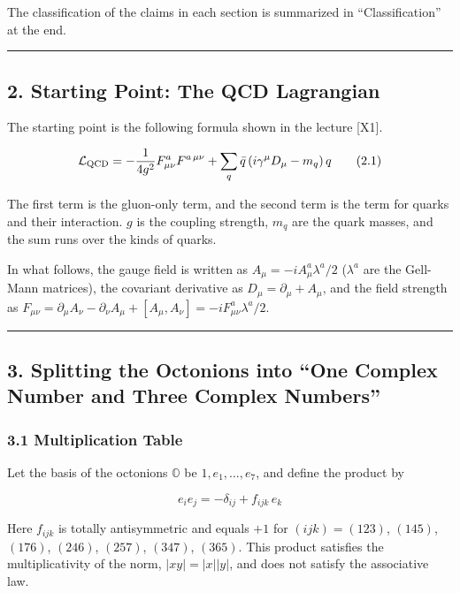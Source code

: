 \documentclass[
  a4paper,
]{article}
\begin{document}
The classification of the claims in each section is summarized in
``Classification'' at the end.

\begin{center}\rule{0.5\linewidth}{0.5pt}\end{center}

\subsection{2. Starting Point: The QCD
Lagrangian}\label{starting-point-the-qcd-lagrangian}

The starting point is the following formula shown in the lecture
{[}X1{]}.

\[
\mathcal{L}_{\rm QCD} = -\frac{1}{4g^2}F^a_{\mu\nu}F^{a\,\mu\nu} + \sum_q \bar q\,(i\gamma^\mu D_\mu - m_q)\,q \tag{2.1}
\]

The first term is the gluon-only term, and the second term is the term
for quarks and their interaction. \(g\) is the coupling strength,
\(m_q\) are the quark masses, and the sum runs over the kinds of quarks.

In what follows, the gauge field is written as
\(A_\mu = -iA^a_\mu\lambda^a/2\) (\(\lambda^a\) are the Gell-Mann
matrices), the covariant derivative as \(D_\mu = \partial_\mu + A_\mu\),
and the field strength as
\(F_{\mu\nu} = \partial_\mu A_\nu - \partial_\nu A_\mu + [A_\mu, A_\nu] = -iF^a_{\mu\nu}\lambda^a/2\).

\begin{center}\rule{0.5\linewidth}{0.5pt}\end{center}

\subsection{3. Splitting the Octonions into ``One Complex Number and
Three Complex
Numbers''}\label{splitting-the-octonions-into-one-complex-number-and-three-complex-numbers}

\subsubsection{3.1 Multiplication Table}\label{multiplication-table}

Let the basis of the octonions \(\mathbb{O}\) be \(1, e_1, \dots, e_7\),
and define the product by

\[
e_i e_j = -\delta_{ij} + f_{ijk}\,e_k \tag{3.1}
\]

Here \(f_{ijk}\) is totally antisymmetric and equals \(+1\) for
\((ijk) = (123)\), \((145)\), \((176)\), \((246)\), \((257)\),
\((347)\), \((365)\). This product satisfies the multiplicativity of the
norm, \(|xy| = |x||y|\), and does not satisfy the associative law.
\end{document}
